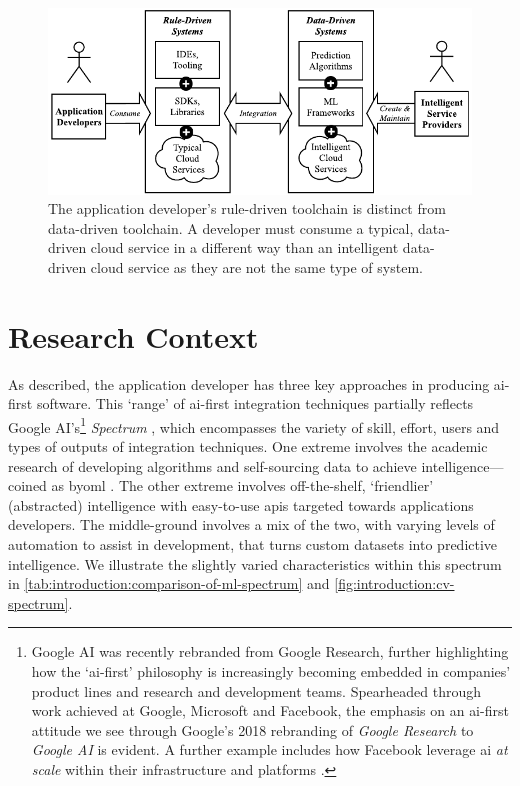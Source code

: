 \begin{figure}
\centering
\caption[Differences between data- and rule-driven cloud services]{The application developer's rule-driven toolchain is distinct from data-driven toolchain. A developer must consume a typical, data-driven cloud service in a different way than an intelligent data-driven cloud service as they are not the same type of system.}
\label{fig:introduction:rule-vs-data}
\includegraphics{rule-vs-data}
\end{figure}

\section{Research Context}%
\label{sec:introduction:context}




As described, the application developer has three key approaches in producing \gls{ai}-first software. This `range' of \gls{ai}-first integration techniques partially reflects Google AI's\footnote{
Google AI was recently rebranded from Google Research, further highlighting how the `\gls{ai}-first' philosophy is increasingly becoming embedded in companies' product lines and research and development teams. Spearheaded through work achieved at Google, Microsoft and Facebook, the emphasis on an \gls{ai}-first attitude we see through Google's 2018 rebranding of \textit{Google Research} to \textit{Google AI}  is evident. A further example includes how Facebook leverage \gls{ai} \textit{at scale} within their infrastructure and platforms \citep{Parekh:2017hx}.
} 
\textit{ Spectrum} \citep{Ortiz:2017wg,LaForge:2018tm,McGowen:2019vt}, which encompasses the variety of skill, effort, users and types of outputs of integration techniques. One extreme involves the academic research of developing algorithms and self-sourcing data to achieve intelligence---coined as \gls{byoml} \citep{Ortiz:2017wg,McGowen:2019vt,Jimerson:2017vh}. The other extreme involves off-the-shelf, `friendlier' (abstracted) intelligence with easy-to-use \glspl{api} targeted towards applications developers. The middle-ground involves a mix of the two, with varying levels of automation to assist in development, that turns custom datasets into predictive intelligence. 
We illustrate the slightly varied characteristics within this spectrum in \cref{tab:introduction:comparison-of-ml-spectrum} and \cref{fig:introduction:cv-spectrum}.

